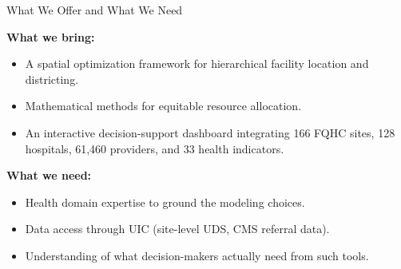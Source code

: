 \documentclass[aspectratio=169]{beamer}
\begin{document}
\begin{frame}{What We Offer and What We Need}

\textbf{What we bring:}
\begin{itemize}
  \item A spatial optimization framework for hierarchical facility location and
        districting.
  \item Mathematical methods for equitable resource allocation.
  \item An interactive decision-support dashboard integrating 166 FQHC sites,
        128 hospitals, 61{,}460 providers, and 33 health indicators.
\end{itemize}

\bigskip
\textbf{What we need:}
\begin{itemize}
  \item Health domain expertise to ground the modeling choices.
  \item Data access through UIC (site-level UDS, CMS referral data).
  \item Understanding of what decision-makers actually need from such tools.
\end{itemize}

\end{frame}
\end{document}
